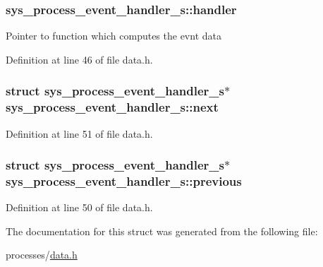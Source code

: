 \subsubsection[{handler}]{ sys\+\_\+process\+\_\+event\+\_\+handler\+\_\+s\+::handler}\label{structsys__process__event__handler__s_a980eeb4cb54ac72cd3ebc38e391c40a5}
Pointer to function which computes the evnt data 

Definition at line 46 of file data.\+h.

\hypertarget{structsys__process__event__handler__s_abd718f866343f0a1e139c977bbae72b8}{}
\subsubsection[{next}]{\setlength{\rightskip}{0pt plus 5cm}struct {\bf sys\+\_\+process\+\_\+event\+\_\+handler\+\_\+s}$\ast$ sys\+\_\+process\+\_\+event\+\_\+handler\+\_\+s\+::next}\label{structsys__process__event__handler__s_abd718f866343f0a1e139c977bbae72b8}


Definition at line 51 of file data.\+h.

\hypertarget{structsys__process__event__handler__s_abbb4742265dace5feffc2a1b05d5271c}{}
\subsubsection[{previous}]{\setlength{\rightskip}{0pt plus 5cm}struct {\bf sys\+\_\+process\+\_\+event\+\_\+handler\+\_\+s}$\ast$ sys\+\_\+process\+\_\+event\+\_\+handler\+\_\+s\+::previous}\label{structsys__process__event__handler__s_abbb4742265dace5feffc2a1b05d5271c}


Definition at line 50 of file data.\+h.



The documentation for this struct was generated from the following file\+:\begin{DoxyCompactItemize}
\item 
processes/\hyperlink{data_8h}{data.\+h}\end{DoxyCompactItemize}

